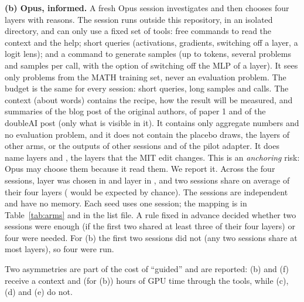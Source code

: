 \documentclass[11pt]{article}
\begin{document}
\textbf{(b) Opus, informed.} A fresh Opus session investigates and then chooses four layers with reasons. The session runs outside this repository, in an isolated directory, and can only use a fixed set of tools: free commands to read the context and the help; short queries (activations, gradients, switching off a layer, a logit lens); and a command to generate samples (up to \MaxTokensEval{} tokens, several problems and samples per call, with the option of switching off the MLP of a layer). It sees only \SweepDiagProblems{} problems from the MATH training set, never an evaluation problem. The budget is the same for every session: \OpusShortQueries{} short queries, \OpusLongSamples{} long samples and \OpusMaxCalls{} calls. The context (about \OpusContextWords{} words) contains the recipe, how the result will be measured, and summaries of the blog post of the original authors, of paper 1 and of the doubleAI post (only what is visible in it). It contains only aggregate numbers and no evaluation problem, and it does not contain the placebo draws, the layers of other arms, or the outputs of other sessions and of the pilot adapter. It does name layers \MitLayerA{} and \MitLayerB{}, the layers that the MIT edit changes. This is an \emph{anchoring} risk: Opus may choose them because it read them. We report it. Across the four sessions, layer \MitLayerA{} was chosen in \OpusLayerFifteen{} and layer \MitLayerB{} in \OpusLayerNineteen{}, and two sessions share on average \OpusSharedMean{} of their four layers (\OpusSharedChance{} would be expected by chance). The sessions are independent and have no memory. Each seed uses one session; the mapping is in Table~\ref{tab:arms} and in the list file. A rule fixed in advance decided whether two sessions were enough (if the first two shared at least three of their four layers) or four were needed. For (b) the first two sessions did not (any two sessions share at most \BSharedFirstTwoMax{} layers), so four were run.

Two asymmetries are part of the cost of ``guided'' and are reported: (b) and (f) receive a context and (for (b)) hours of GPU time through the tools, while (c), (d) and (e) do not.
\end{document}
